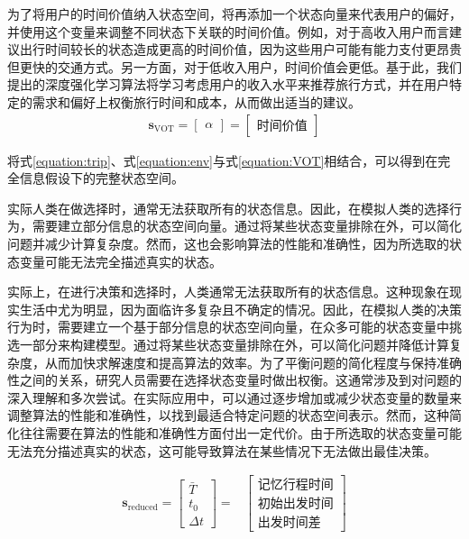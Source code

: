 为了将用户的时间价值纳入状态空间，将再添加一个状态向量来代表用户的偏好，并使用这个变量来调整不同状态下关联的时间价值。例如，对于高收入用户而言建议出行时间较长的状态造成更高的时间价值，因为这些用户可能有能力支付更昂贵但更快的交通方式。另一方面，对于低收入用户，时间价值会更低。基于此，我们提出的深度强化学习算法将学习考虑用户的收入水平来推荐旅行方式，并在用户特定的需求和偏好上权衡旅行时间和成本，从而做出适当的建议。
\begin{equation}
\begin{aligned}
\bm{s}_\text{VOT}=\left[\begin{array}{c}
\alpha
\end{array}\right]=\left[\begin{array}{c}
\text {时间价值} 
\end{array}\right]
\end{aligned}\label{equation:VOT}
\end{equation}

将式\ref{equation:trip}、式\ref{equation:env}与式\ref{equation:VOT}相结合，可以得到在完全信息假设下的完整状态空间。

实际人类在做选择时，通常无法获取所有的状态信息。因此，在模拟人类的选择行为，需要建立部分信息的状态空间向量。通过将某些状态变量排除在外，可以简化问题并减少计算复杂度。然而，这也会影响算法的性能和准确性，因为所选取的状态变量可能无法完全描述真实的状态。

实际上，在进行决策和选择时，人类通常无法获取所有的状态信息。这种现象在现实生活中尤为明显，因为面临许多复杂且不确定的情况。因此，在模拟人类的决策行为时，需要建立一个基于部分信息的状态空间向量，在众多可能的状态变量中挑选一部分来构建模型。通过将某些状态变量排除在外，可以简化问题并降低计算复杂度，从而加快求解速度和提高算法的效率。为了平衡问题的简化程度与保持准确性之间的关系，研究人员需要在选择状态变量时做出权衡。这通常涉及到对问题的深入理解和多次尝试。在实际应用中，可以通过逐步增加或减少状态变量的数量来调整算法的性能和准确性，以找到最适合特定问题的状态空间表示。然而，这种简化往往需要在算法的性能和准确性方面付出一定代价。由于所选取的状态变量可能无法充分描述真实的状态，这可能导致算法在某些情况下无法做出最佳决策。

\begin{equation}
\begin{aligned}
\bm{s}_\text{reduced}=\left[\begin{array}{c}
\bar{T} \\
t_{0} \\
\Delta t
\end{array}\right]=&\left[\begin{array}{c}
\text {记忆行程时间} \\
\text {初始出发时间} \\
\text {出发时间差}
\end{array}\right]
\end{aligned}\label{equation:obs}
\end{equation}



